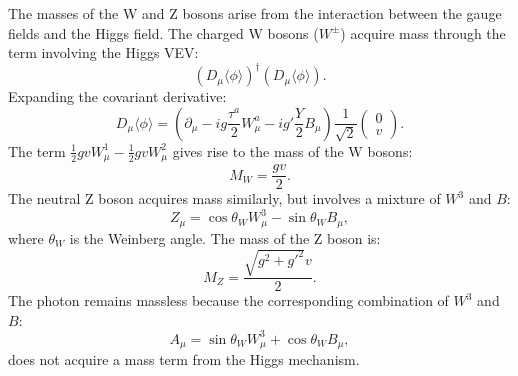             The masses of the W and Z bosons arise from the interaction between the gauge fields and the Higgs field.
            The charged W bosons (\(W^\pm\)) acquire mass through the term involving the Higgs VEV:
            \[
            (D_\mu \langle \phi \rangle)^\dagger (D_\mu \langle \phi \rangle).
            \]
            Expanding the covariant derivative:
            \[
            D_\mu \langle \phi \rangle = \left( \partial_\mu - i g \frac{\tau^a}{2} W_\mu^a - i g' \frac{Y}{2} B_\mu \right) \frac{1}{\sqrt{2}} \begin{pmatrix} 0 \\ v \end{pmatrix}.
            \]
            The term \(\frac{1}{2} g v W_\mu^1 - \frac{1}{2} g v W_\mu^2\) gives rise to the mass of the W bosons:
            \[
            M_W = \frac{gv}{2}.
            \]
            The neutral Z boson acquires mass similarly, but involves a mixture of \(W^3\) and \(B\):
            \[
            Z_\mu = \cos \theta_W W_\mu^3 - \sin \theta_W B_\mu,
            \]
            where \(\theta_W\) is the Weinberg angle. The mass of the Z boson is:
            \[
            M_Z = \frac{\sqrt{g^2 + g'^2} v}{2}.
            \]
            The photon remains massless because the corresponding combination of \(W^3\) and \(B\):
            \[
            A_\mu = \sin \theta_W W_\mu^3 + \cos \theta_W B_\mu,
            \]
            does not acquire a mass term from the Higgs mechanism.

